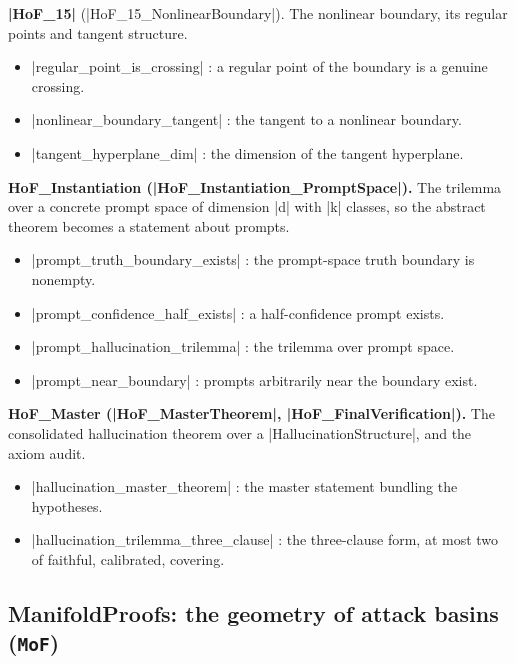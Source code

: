 \documentclass{memoir}
\begin{document}
\textbf{\LeanVerb|HoF_15|} (\LeanVerb|HoF_15_NonlinearBoundary|). The nonlinear boundary, its regular points
and tangent structure.

\begin{itemize}
\item \LeanVerb|regular_point_is_crossing| : a regular point of the boundary is a genuine
   crossing.
\item \LeanVerb|nonlinear_boundary_tangent| : the tangent to a nonlinear boundary.
\item \LeanVerb|tangent_hyperplane_dim| : the dimension of the tangent hyperplane.

\end{itemize}


\textbf{HoF\_Instantiation (\LeanVerb|HoF_Instantiation_PromptSpace|).} The trilemma over a concrete
prompt space of dimension \LeanVerb|d| with \LeanVerb|k| classes, so the abstract theorem becomes a
statement about prompts.

\begin{itemize}
\item \LeanVerb|prompt_truth_boundary_exists| : the prompt-space truth boundary is nonempty.
\item \LeanVerb|prompt_confidence_half_exists| : a half-confidence prompt exists.
\item \LeanVerb|prompt_hallucination_trilemma| : the trilemma over prompt space.
\item \LeanVerb|prompt_near_boundary| : prompts arbitrarily near the boundary exist.

\end{itemize}


\textbf{HoF\_Master (\LeanVerb|HoF_MasterTheorem|, \LeanVerb|HoF_FinalVerification|).} The consolidated
hallucination theorem over a \LeanVerb|HallucinationStructure|, and the axiom audit.

\begin{itemize}
\item \LeanVerb|hallucination_master_theorem| : the master statement bundling the hypotheses.
\item \LeanVerb|hallucination_trilemma_three_clause| : the three-clause form, at most two of
   faithful, calibrated, covering.

\end{itemize}




\subsection{ManifoldProofs: the geometry of attack basins (\texttt{MoF})}\label{Two--Schemas--of--Impossibility-005F-005F-005F--Machine--Checked--Limits--of--Trustworthy--Machine--Learning-005F-005F-005F--and--Why--They--Tighten--with--Capability----Appendices----The--Formal--Corpus----ManifoldProofs-005F-005F-005F--the--geometry--of--attack--basins---005FLPAR-005F--MoF---005FRPAR-005F}
\end{document}
